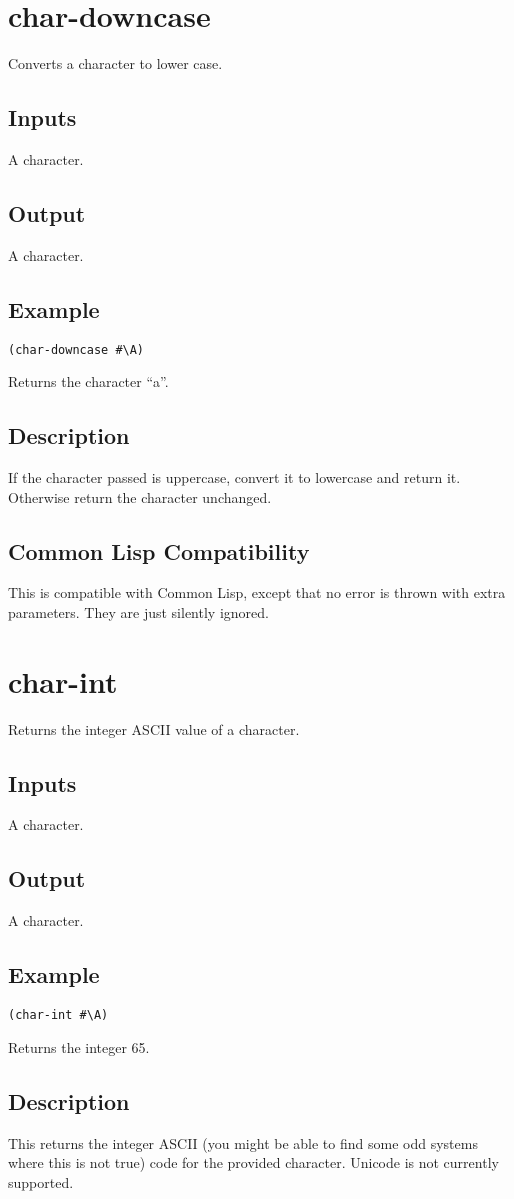 \documentclass[10pt, openany]{book}
\newcommand{\cl}{Common Lisp}
\begin{document}
\section{char-downcase}
Converts a character to lower case.
\subsection{Inputs}
A character.
\subsection{Output}
A character.
\subsection{Example}
\begin{lstlisting}
(char-downcase #\A)
\end{lstlisting}
Returns the character ``a''.
\subsection{Description}
If the character passed is uppercase, convert it to lowercase and return it.  Otherwise return the character unchanged.
\subsection{Common Lisp Compatibility}
This is compatible with \cl, except that no error is thrown with extra parameters.  They are just silently ignored.

\section{char-int}
Returns the integer ASCII value of a character.
\subsection{Inputs}
A character.
\subsection{Output}
A character.
\subsection{Example}
\begin{lstlisting}
(char-int #\A)
\end{lstlisting}
Returns the integer 65.
\subsection{Description}
This returns the integer ASCII (you might be able to find some odd systems where this is not true) code for the provided character.  Unicode is not currently supported.
\end{document}
